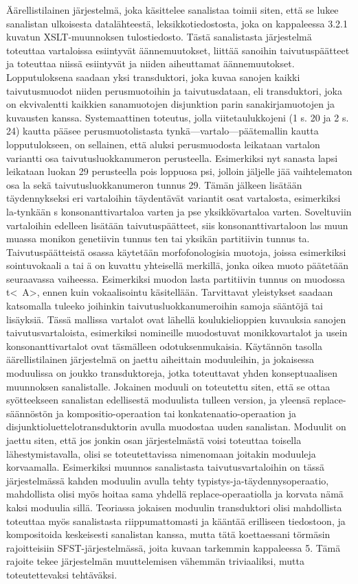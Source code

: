 \documentclass[free]{flammie}
\begin{document}
Äärellistilainen järjestelmä, joka käsittelee sanalistaa toimii siten, että se lukee
sanalistan ulkoisesta datalähteestä, leksikkotiedostosta, joka on kappaleessa 3.2.1
kuvatun XSLT-muunnoksen tulostiedosto. Tästä sanalistasta järjestelmä toteuttaa
vartaloissa esiintyvät äännemuutokset, liittää sanoihin taivutuspäätteet ja toteuttaa
niissä esiintyvät ja niiden aiheuttamat äännemuutokset. Lopputuloksena saadaan
yksi transduktori, joka kuvaa sanojen kaikki taivutusmuodot niiden perusmuotoihin ja taivutusdataan, eli transduktori, joka on ekvivalentti kaikkien sanamuotojen
disjunktion parin sanakirjamuotojen ja kuvausten kanssa.
Systemaattinen toteutus, jolla viitetaulukkojeni (1 s. 20 ja 2 s. 24) kautta pääsee
perusmuotolistasta tynkä—vartalo—päätemallin kautta lopputulokseen, on sellainen, että aluksi perusmuodosta leikataan vartalon variantti osa taivutusluokkanumeron perusteella. Esimerkiksi nyt sanasta lapsi leikataan luokan 29 perusteella
pois loppuosa psi, jolloin jäljelle jää vaihtelematon osa la sekä taivutusluokkanumeron tunnus 29. Tämän jälkeen lisätään täydennykseksi eri vartaloihin täydentävät variantit osat vartalosta, esimerkiksi la-tynkään s konsonanttivartaloa varten ja
pse yksikkövartaloa varten. Soveltuviin vartaloihin edelleen lisätään taivutuspäätteet, siis konsonanttivartaloon las muun muassa monikon genetiivin tunnus ten tai
yksikän partitiivin tunnus ta. Taivutuspäätteistä osassa käytetään morfofonologisia muotoja, joissa esimerkiksi sointuvokaali a tai ä on kuvattu yhteisellä merkillä, jonka oikea muoto päätetään seuraavassa vaiheessa. Esimerkiksi muodon lasta
partitiivin tunnus on muodossa t<~A>, ennen kuin vokaalisointu käsitellään. Tarvittavat yleistykset saadaan katsomalla tuleeko joihinkin taivutusluokkanumeroihin samoja sääntöjä tai lisäyksiä. Tässä mallissa vartalot ovat lähellä koulukielioppien kuvauksia sanojen taivutusvartaloista, esimerkiksi nomineille muodostuvat
monikkovartalot ja usein konsonanttivartalot ovat täsmälleen odotuksenmukaisia.
Käytännön tasolla äärellistilainen järjestelmä on jaettu aiheittain moduuleihin, ja
jokaisessa moduulissa on joukko transduktoreja, jotka toteuttavat yhden konseptuaalisen muunnoksen sanalistalle. Jokainen moduuli on toteutettu siten, että se
ottaa syötteekseen sanalistan edellisestä moduulista tulleen version, ja yleensä
replace-säännöstön ja kompositio-operaation tai konkatenaatio-operaation ja disjunktioluettelotransduktorin avulla muodostaa uuden sanalistan.
Moduulit on jaettu siten, että jos jonkin osan järjestelmästä voisi toteuttaa toisella lähestymistavalla, olisi se toteutettavissa nimenomaan joitakin moduuleja korvaamalla. Esimerkiksi muunnos sanalistasta taivutusvartaloihin on tässä järjestelmässä kahden moduulin avulla tehty typistys-ja-täydennysoperaatio, mahdollista
olisi myös hoitaa sama yhdellä replace-operaatiolla ja korvata nämä kaksi moduulia sillä. Teoriassa jokaisen moduulin transduktori olisi mahdollista toteuttaa
myös sanalistasta riippumattomasti ja kääntää erilliseen tiedostoon, ja kompositoida keskeisesti sanalistan kanssa, mutta tätä koettaessani törmäsin rajoitteisiin
SFST-järjestelmässä, joita kuvaan tarkemmin kappaleessa 5. Tämä rajoite tekee
järjestelmän muuttelemisen vähemmän triviaaliksi, mutta toteutettevaksi tehtäväksi.
\end{document}
